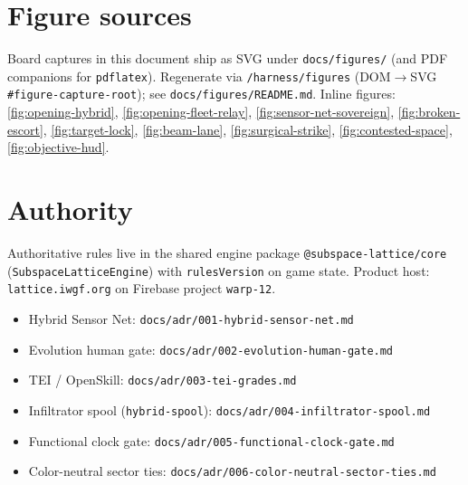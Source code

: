 \documentclass[11pt,a4paper]{article}
\begin{document}
\section{Figure sources}
\label{sec:figures}

Board captures in this document ship as SVG under \texttt{docs/figures/}
(and PDF companions for \texttt{pdflatex}). Regenerate via
\texttt{/harness/figures} (DOM$\to$SVG \texttt{\#figure-capture-root});
see \texttt{docs/figures/README.md}. Inline figures:
\ref{fig:opening-hybrid},
\ref{fig:opening-fleet-relay},
\ref{fig:sensor-net-sovereign},
\ref{fig:broken-escort},
\ref{fig:target-lock},
\ref{fig:beam-lane},
\ref{fig:surgical-strike},
\ref{fig:contested-space},
\ref{fig:objective-hud}.

\section{Authority}

Authoritative rules live in the shared engine package
\texttt{@subspace-lattice/core} (\texttt{SubspaceLatticeEngine}) with
\texttt{rulesVersion} on game state. Product host:
\texttt{lattice.iwgf.org} on Firebase project \texttt{warp-12}.

\begin{itemize}[leftmargin=*]
  \item Hybrid Sensor Net: \texttt{docs/adr/001-hybrid-sensor-net.md}
  \item Evolution human gate: \texttt{docs/adr/002-evolution-human-gate.md}
  \item TEI / OpenSkill: \texttt{docs/adr/003-tei-grades.md}
  \item Infiltrator spool (\texttt{hybrid-spool}): \texttt{docs/adr/004-infiltrator-spool.md}
  \item Functional clock gate: \texttt{docs/adr/005-functional-clock-gate.md}
  \item Color-neutral sector ties: \texttt{docs/adr/006-color-neutral-sector-ties.md}
\end{itemize}
\end{document}
